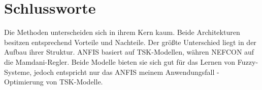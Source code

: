 \section{Schlussworte}


Die Methoden unterscheiden sich in ihrem Kern kaum. Beide Architekturen besitzen entsprechend Vorteile und Nachteile. Der größte Unterschied liegt in der Aufbau ihrer Struktur. ANFIS basiert auf TSK-Modellen, währen NEFCON auf die Mamdani-Regler. Beide Modelle bieten sie sich gut für das Lernen von Fuzzy-Systeme, jedoch entspricht nur das ANFIS meinem Anwendungsfall - Optimierung von TSK-Modelle.